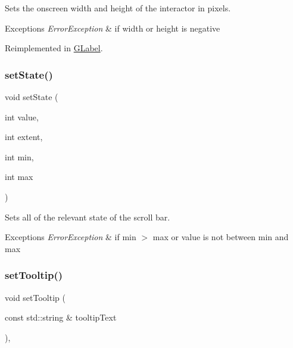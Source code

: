 Sets the onscreen width and height of the interactor in pixels. 


\begin{DoxyExceptions}{Exceptions}
{\em Error\+Exception} & if width or height is negative \\
\hline
\end{DoxyExceptions}


Reimplemented in \mbox{\hyperlink{classGLabel_a42d96e60c62d7770993327d7147d77b8}{G\+Label}}.

\mbox{\label{classGScrollBar_a83549f22abf65099f4c661a4601ade2b}} 
\subsubsection{\texorpdfstring{set\+State()}{setState()}}
{\footnotesize\ttfamily void set\+State (\begin{DoxyParamCaption}\item[{int}]{value,  }\item[{int}]{extent,  }\item[{int}]{min,  }\item[{int}]{max }\end{DoxyParamCaption})\hspace{0.3cm}{\ttfamily [virtual]}}



Sets all of the relevant state of the scroll bar. 


\begin{DoxyExceptions}{Exceptions}
{\em Error\+Exception} & if min $>$ max or value is not between min and max \\
\hline
\end{DoxyExceptions}
\mbox{\label{classGInteractor_a039e0e49beaecc275efce02d416acea8}} 
\subsubsection{\texorpdfstring{set\+Tooltip()}{setTooltip()}}
{\footnotesize\ttfamily void set\+Tooltip (\begin{DoxyParamCaption}\item[{const std\+::string \&}]{tooltip\+Text }\end{DoxyParamCaption})\hspace{0.3cm}{\ttfamily [virtual]}, {\ttfamily [inherited]}}



